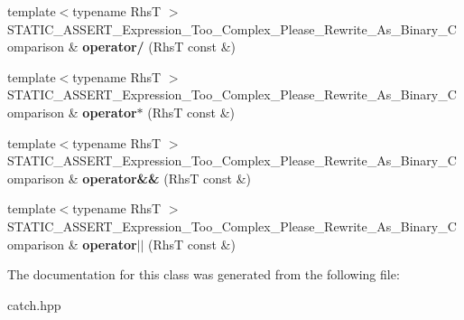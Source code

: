 \begin{DoxyCompactItemize}
\item 
{\footnotesize template$<$typename RhsT $>$ }\\S\+T\+A\+T\+I\+C\+\_\+\+A\+S\+S\+E\+R\+T\+\_\+\+Expression\+\_\+\+Too\+\_\+\+Complex\+\_\+\+Please\+\_\+\+Rewrite\+\_\+\+As\+\_\+\+Binary\+\_\+\+Comparison \& {\bfseries operator/} (RhsT const \&)\hypertarget{classCatch_1_1ExpressionLhs_a37d50565046ac9b1c9159a7c0cf88a1e}{}\label{classCatch_1_1ExpressionLhs_a37d50565046ac9b1c9159a7c0cf88a1e}

\item 
{\footnotesize template$<$typename RhsT $>$ }\\S\+T\+A\+T\+I\+C\+\_\+\+A\+S\+S\+E\+R\+T\+\_\+\+Expression\+\_\+\+Too\+\_\+\+Complex\+\_\+\+Please\+\_\+\+Rewrite\+\_\+\+As\+\_\+\+Binary\+\_\+\+Comparison \& {\bfseries operator$\ast$} (RhsT const \&)\hypertarget{classCatch_1_1ExpressionLhs_a9a94294c22449f62087862ef911e6291}{}\label{classCatch_1_1ExpressionLhs_a9a94294c22449f62087862ef911e6291}

\item 
{\footnotesize template$<$typename RhsT $>$ }\\S\+T\+A\+T\+I\+C\+\_\+\+A\+S\+S\+E\+R\+T\+\_\+\+Expression\+\_\+\+Too\+\_\+\+Complex\+\_\+\+Please\+\_\+\+Rewrite\+\_\+\+As\+\_\+\+Binary\+\_\+\+Comparison \& {\bfseries operator\&\&} (RhsT const \&)\hypertarget{classCatch_1_1ExpressionLhs_a7f022056ef4f25e716ab85846be6229f}{}\label{classCatch_1_1ExpressionLhs_a7f022056ef4f25e716ab85846be6229f}

\item 
{\footnotesize template$<$typename RhsT $>$ }\\S\+T\+A\+T\+I\+C\+\_\+\+A\+S\+S\+E\+R\+T\+\_\+\+Expression\+\_\+\+Too\+\_\+\+Complex\+\_\+\+Please\+\_\+\+Rewrite\+\_\+\+As\+\_\+\+Binary\+\_\+\+Comparison \& {\bfseries operator$\vert$$\vert$} (RhsT const \&)\hypertarget{classCatch_1_1ExpressionLhs_a6932b72da79d6c6b03d867772ceac61b}{}\label{classCatch_1_1ExpressionLhs_a6932b72da79d6c6b03d867772ceac61b}

\end{DoxyCompactItemize}


The documentation for this class was generated from the following file\+:\begin{DoxyCompactItemize}
\item 
catch.\+hpp\end{DoxyCompactItemize}
